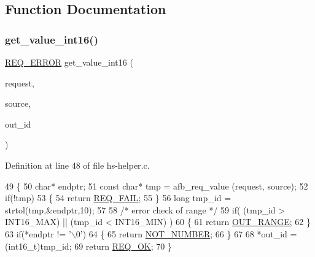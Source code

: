 \subsection{Function Documentation}
\mbox{\label{hs-helper_8c_a2e62366684e39ea94436bf017e416827}} 
\subsubsection{\texorpdfstring{get\+\_\+value\+\_\+int16()}{get\_value\_int16()}}
{\footnotesize\ttfamily \hyperlink{hs-helper_8h_aa49f1dbbf26f01627a5737cf43aad899}{R\+E\+Q\+\_\+\+E\+R\+R\+OR} get\+\_\+value\+\_\+int16 (\begin{DoxyParamCaption}\item[{const struct afb\+\_\+req}]{request,  }\item[{const char $\ast$}]{source,  }\item[{int16\+\_\+t $\ast$}]{out\+\_\+id }\end{DoxyParamCaption})}



Definition at line 48 of file hs-\/helper.\+c.


\begin{DoxyCode}
49 \{
50     \textcolor{keywordtype}{char}* endptr;
51     \textcolor{keyword}{const} \textcolor{keywordtype}{char}* tmp = afb\_req\_value (request, source);
52     \textcolor{keywordflow}{if}(!tmp)
53     \{
54         \textcolor{keywordflow}{return} \hyperlink{hs-helper_8h_aa49f1dbbf26f01627a5737cf43aad899a96a855966bc63045222b3dcac524cee1}{REQ\_FAIL};
55     \}
56     \textcolor{keywordtype}{long} tmp\_id = strtol(tmp,&endptr,10);
57 
58     \textcolor{comment}{/* error check of range */}
59     \textcolor{keywordflow}{if}( (tmp\_id > INT16\_MAX) || (tmp\_id < INT16\_MIN) )
60     \{
61         \textcolor{keywordflow}{return} \hyperlink{hs-helper_8h_aa49f1dbbf26f01627a5737cf43aad899add1c84bf80c5f80741ee8f37fef1e12b}{OUT\_RANGE};
62     \}
63     \textcolor{keywordflow}{if}(*endptr != \textcolor{charliteral}{'\(\backslash\)0'})
64     \{
65         \textcolor{keywordflow}{return} \hyperlink{hs-helper_8h_aa49f1dbbf26f01627a5737cf43aad899aa223eed65c9bee2bf1f4cdecaf90d66a}{NOT\_NUMBER};
66     \}
67 
68     *out\_id = (int16\_t)tmp\_id;
69     \textcolor{keywordflow}{return} \hyperlink{hs-helper_8h_aa49f1dbbf26f01627a5737cf43aad899ab093abb14c097b3b7719debb04d5e8ee}{REQ\_OK};
70 \}
\end{DoxyCode}
\mbox{\label{hs-helper_8c_ac5b0370643c520377afd3fd4891918d2}} 
